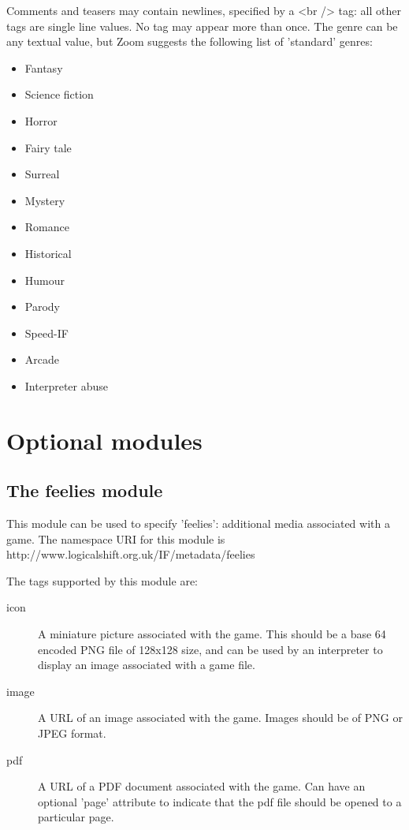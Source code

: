 \documentclass[a4paper,11pt]{article}
\begin{document}
Comments and teasers may contain newlines, specified by a <br /> tag: all other tags are
single line values. No tag may appear more than once. The genre can be any textual value,
but Zoom suggests the following list of 'standard' genres:

\begin{itemize}
\item Fantasy
\item Science fiction
\item Horror
\item Fairy tale
\item Surreal
\item Mystery
\item Romance
\item Historical
\item Humour
\item Parody
\item Speed-IF
\item Arcade
\item Interpreter abuse
\end{itemize}

\section{Optional modules}

\subsection{The feelies module}

This module can be used to specify 'feelies': additional media associated with a game. The namespace URI for this module is 
http://www.logicalshift.org.uk/IF/metadata/feelies

The tags supported by this module are:

\begin{description}
\item[icon] A miniature picture associated with the game. This should be a base 64 encoded 
PNG file of 128x128 size, and can be used by an interpreter to display an image associated with
a game file.
\item[image] A URL of an image associated with the game. Images should be of PNG or
JPEG format.
\item[pdf] A URL of a PDF document associated with the game. Can have an optional 'page' attribute to indicate that the
pdf file should be opened to a particular page.
\end{description}
\end{document}
